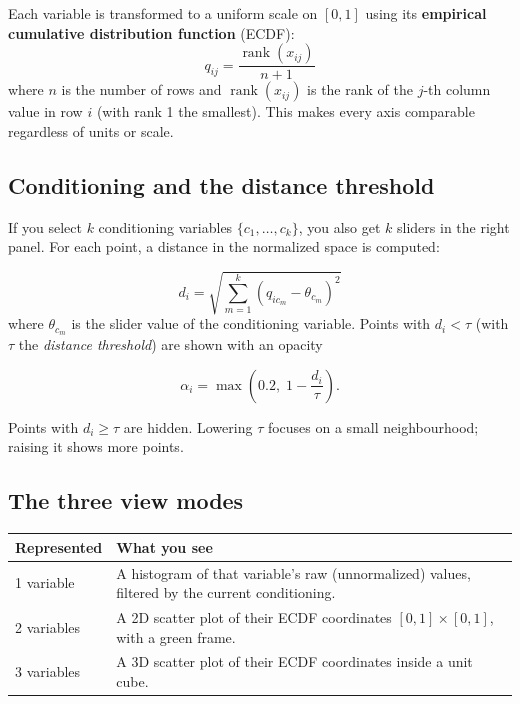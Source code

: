 \documentclass[11pt,a4paper]{article}
\begin{document}
Each variable is transformed to a uniform scale on $[0,1]$ using its \textbf{empirical cumulative distribution function} (ECDF):
\begin{equation}
  q_{ij} = \frac{\operatorname{rank}(x_{ij})}{n+1}
\end{equation}
where $n$ is the number of rows and $\operatorname{rank}(x_{ij})$ is the rank of the $j$-th column value in row $i$ (with rank 1 the smallest). This makes every axis comparable regardless of units or scale.

\subsection{Conditioning and the distance threshold}

If you select $k$ conditioning variables $\{c_1,\dots,c_k\}$, you also get $k$ sliders in the right panel. For each point, a distance in the normalized space is computed:

\begin{equation}
  d_i = \sqrt{\sum_{m=1}^{k} \left(q_{i c_m} - \theta_{c_m}\right)^2}
\end{equation}
where $\theta_{c_m}$ is the slider value of the conditioning variable. Points with $d_i < \tau$ (with $\tau$ the \emph{distance threshold}) are shown with an opacity

\begin{equation}
  \alpha_i = \max\left(0.2,\; 1 - \frac{d_i}{\tau}\right).
\end{equation}

Points with $d_i \ge \tau$ are hidden. Lowering $\tau$ focuses on a small neighbourhood; raising it shows more points.

\subsection{The three view modes}

\begin{center}
\begin{tabularx}{\textwidth}{lX}
\toprule
\textbf{Represented} & \textbf{What you see} \\
\midrule
1 variable & A histogram of that variable's raw (unnormalized) values, filtered by the current conditioning. \\
2 variables & A 2D scatter plot of their ECDF coordinates $[0,1]\times[0,1]$, with a green frame. \\
3 variables & A 3D scatter plot of their ECDF coordinates inside a unit cube. \\
\bottomrule
\end{tabularx}
\end{center}
\end{document}
